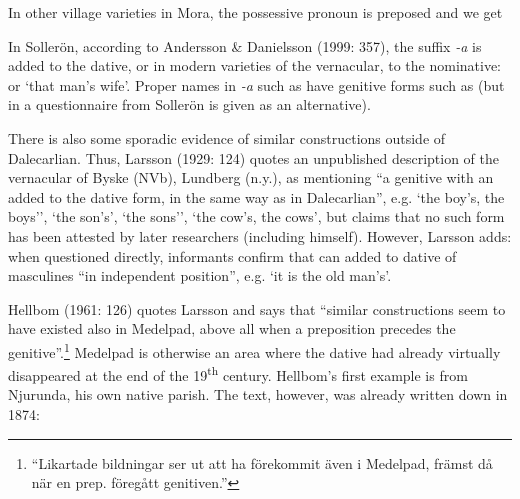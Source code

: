 In other village varieties in Mora, the possessive pronoun is preposed and we get 

In Sollerön, according to Andersson \& Danielsson (1999: 357), the suffix\textit{ {}-a} is added to the dative, or in modern varieties of the vernacular, to the nominative:  or  ‘that man’s wife’. Proper names in\textit{ {}-a} such as  have genitive forms such as (but in a questionnaire from Sollerön  is given as an alternative).

There is also some sporadic evidence of similar constructions outside of Dalecarlian. Thus, Larsson (1929: 124) quotes an unpublished description of the vernacular of Byske (NVb), Lundberg (n.y.), as mentioning “a genitive with an  added to the dative form, in the same way as in Dalecarlian”, e.g.  ‘the boy’s, the boys’’,  ‘the son’s’,  ‘the sons’’,  ‘the cow’s, the cows’, but claims that no such form has been attested by later researchers (including himself). However, Larsson adds: when questioned directly, informants confirm that  can added to dative of masculines “in independent position”, e.g.  ‘it is the old man’s’. 

Hellbom (1961: 126) quotes Larsson and says that “similar constructions seem to have existed also in Medelpad, above all when a preposition precedes the genitive”.\footnote{ “Likartade bildningar ser ut att ha förekommit även i Medelpad, främst då när en prep. föregått genitiven.”} Medelpad is otherwise an area where the dative had already virtually disappeared at the end of the 19\textsuperscript{th} century. Hellbom’s first example is from Njurunda, his own native parish. The text, however, was already written down in 1874:

